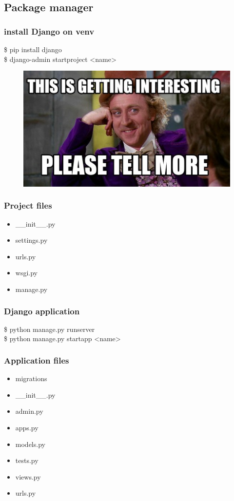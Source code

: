 \documentclass{beamer}
\begin{document}
\subsection{Package manager}
\begin{frame}
	\frametitle{install Django on venv}
	\centering
	\Large
	\begin{block}{}
	\$ pip install django\\
	\$ django-admin startproject <name>
	\end{block}
\end{frame}

\begin{frame}
	\begin{figure}
		\includegraphics[width=0.8\linewidth]{Pics/proj.jpeg}
	\end{figure}
\end{frame}

\begin{frame}
\frametitle{Project files}
	\begin{itemize}
		\item \_\_init\_\_.py
		\item settings.py
		\item urls.py
		\item wsgi.py
		\item manage.py
	\end{itemize}
\end{frame}

\begin{frame}
	\frametitle{Django application}
	\centering
	\Large
	\begin{block}{}
		\$ python manage.py runserver\\
		\$ python manage.py startapp <name>
	\end{block}
\end{frame}

\begin{frame}
\frametitle{Application files}
\begin{itemize}
	\item migrations
	\item \_\_init\_\_.py
	\item admin.py
	\item apps.py
	\item models.py
	\item tests.py
	\item views.py
	\item urls.py
\end{itemize}
\end{frame}
\end{document}
